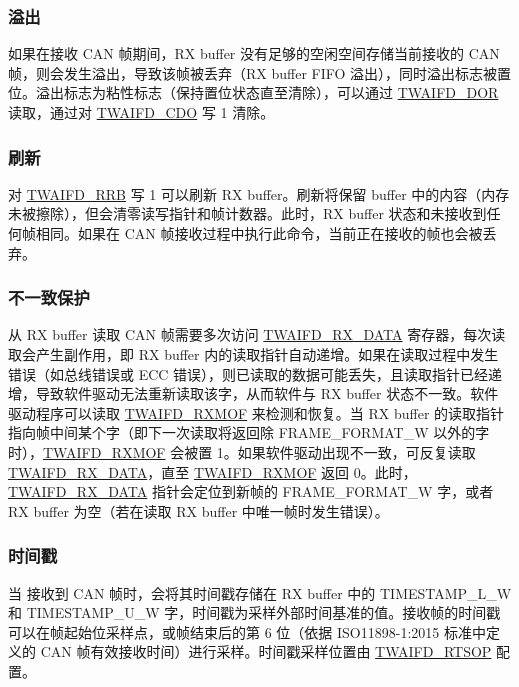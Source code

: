\documentclass[main\_\_CN.tex]{subfiles}
\begin{document}
\subsubsection{溢出}

如果在接收 CAN 帧期间，RX buffer 没有足够的空闲空间存储当前接收的 CAN 帧，则会发生溢出，导致该帧被丢弃（RX buffer FIFO 溢出），同时溢出标志被置位。溢出标志为粘性标志（保持置位状态直至清除），可以通过 \hyperref[fielddesc:TWAIFDDOR]{TWAIFD\_DOR} 读取，通过对 \hyperref[fielddesc:TWAIFDCDO]{TWAIFD\_CDO} 写 1 清除。

\subsubsection{刷新}
\label{sec:twai-func-flush}

对 \hyperref[fielddesc:TWAIFDRRB]{TWAIFD\_RRB} 写 1 可以刷新 RX buffer。刷新将保留 buffer 中的内容（内存未被擦除），但会清零读写指针和帧计数器。此时，RX buffer 状态和未接收到任何帧相同。如果在 CAN 帧接收过程中执行此命令，当前正在接收的帧也会被丢弃。

\subsubsection{不一致保护}

从 RX buffer 读取 CAN 帧需要多次访问 \hyperref[regdesc:TWAIFDRXDATAREG]{TWAIFD\_RX\_DATA} 寄存器，每次读取会产生副作用，即 RX buffer 内的读取指针自动递增。如果在读取过程中发生错误（如总线错误或 ECC 错误），则已读取的数据可能丢失，且读取指针已经递增，导致软件驱动无法重新读取该字，从而软件与 RX buffer 状态不一致。软件驱动程序可以读取 \hyperref[fielddesc:TWAIFDRXMOF]{TWAIFD\_RXMOF} 来检测和恢复。当 RX buffer 的读取指针指向帧中间某个字（即下一次读取将返回除 FRAME\_FORMAT\_W 以外的字时），\hyperref[fielddesc:TWAIFDRXMOF]{TWAIFD\_RXMOF} 会被置 1。如果软件驱动出现不一致，可反复读取 \hyperref[regdesc:TWAIFDRXDATAREG]{TWAIFD\_RX\_DATA}，直至 \hyperref[fielddesc:TWAIFDRXMOF]{TWAIFD\_RXMOF} 返回 0。此时，\hyperref[regdesc:TWAIFDRXDATAREG]{TWAIFD\_RX\_DATA} 指针会定位到新帧的 FRAME\_FORMAT\_W 字，或者 RX buffer 为空（若在读取 RX buffer 中唯一帧时发生错误）。

\subsubsection{时间戳}

当 \modulename{} 接收到 CAN 帧时，会将其时间戳存储在 RX buffer 中的 TIMESTAMP\_L\_W 和 TIMESTAMP\_U\_W 字，时间戳为采样外部时间基准的值。接收帧的时间戳可以在帧起始位采样点，或帧结束后的第 6 位（依据 ISO11898-1:2015 标准中定义的 CAN 帧有效接收时间）进行采样。时间戳采样位置由 \hyperref[fielddesc:TWAIFDRTSOP]{TWAIFD\_RTSOP} 配置。
\end{document}
